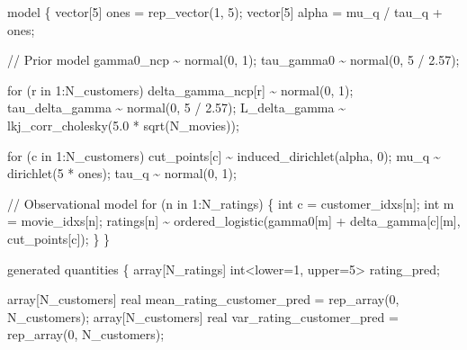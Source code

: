 \documentclass[
  letterpaper,
  DIV=11,
  numbers=noendperiod]{scrartcl}
\newenvironment{Shaded}{\begin{snugshade}}{\end{snugshade}}
\newcommand{\CommentTok}[1]{\textcolor[rgb]{0.37,0.37,0.37}{#1}}
\newcommand{\ControlFlowTok}[1]{\textcolor[rgb]{0.00,0.23,0.31}{#1}}
\newcommand{\DataTypeTok}[1]{\textcolor[rgb]{0.68,0.00,0.00}{#1}}
\newcommand{\DecValTok}[1]{\textcolor[rgb]{0.68,0.00,0.00}{#1}}
\newcommand{\FloatTok}[1]{\textcolor[rgb]{0.68,0.00,0.00}{#1}}
\newcommand{\KeywordTok}[1]{\textcolor[rgb]{0.00,0.23,0.31}{#1}}
\newcommand{\NormalTok}[1]{\textcolor[rgb]{0.00,0.23,0.31}{#1}}
\begin{document}
\begin{codelisting}
\begin{Shaded}
\begin{Highlighting}[]
\KeywordTok{model}\NormalTok{ \{}
  \DataTypeTok{vector}\NormalTok{[}\DecValTok{5}\NormalTok{] ones = rep\_vector(}\DecValTok{1}\NormalTok{, }\DecValTok{5}\NormalTok{);}
  \DataTypeTok{vector}\NormalTok{[}\DecValTok{5}\NormalTok{] alpha = mu\_q / tau\_q + ones;}

  \CommentTok{// Prior model}
\NormalTok{  gamma0\_ncp \textasciitilde{} normal(}\DecValTok{0}\NormalTok{, }\DecValTok{1}\NormalTok{);}
\NormalTok{  tau\_gamma0 \textasciitilde{} normal(}\DecValTok{0}\NormalTok{, }\DecValTok{5}\NormalTok{ / }\FloatTok{2.57}\NormalTok{);}

  \ControlFlowTok{for}\NormalTok{ (r }\ControlFlowTok{in} \DecValTok{1}\NormalTok{:N\_customers)}
\NormalTok{    delta\_gamma\_ncp[r] \textasciitilde{} normal(}\DecValTok{0}\NormalTok{, }\DecValTok{1}\NormalTok{);}
\NormalTok{  tau\_delta\_gamma \textasciitilde{} normal(}\DecValTok{0}\NormalTok{, }\DecValTok{5}\NormalTok{ / }\FloatTok{2.57}\NormalTok{);}
\NormalTok{  L\_delta\_gamma \textasciitilde{} lkj\_corr\_cholesky(}\FloatTok{5.0}\NormalTok{ * sqrt(N\_movies));}

  \ControlFlowTok{for}\NormalTok{ (c }\ControlFlowTok{in} \DecValTok{1}\NormalTok{:N\_customers)}
\NormalTok{    cut\_points[c] \textasciitilde{} induced\_dirichlet(alpha, }\DecValTok{0}\NormalTok{);}
\NormalTok{  mu\_q \textasciitilde{} dirichlet(}\DecValTok{5}\NormalTok{ * ones);}
\NormalTok{  tau\_q \textasciitilde{} normal(}\DecValTok{0}\NormalTok{, }\DecValTok{1}\NormalTok{);}

  \CommentTok{// Observational model}
  \ControlFlowTok{for}\NormalTok{ (n }\ControlFlowTok{in} \DecValTok{1}\NormalTok{:N\_ratings) \{}
    \DataTypeTok{int}\NormalTok{ c = customer\_idxs[n];}
    \DataTypeTok{int}\NormalTok{ m = movie\_idxs[n];}
\NormalTok{    ratings[n] \textasciitilde{} ordered\_logistic(gamma0[m] + delta\_gamma[c][m],}
\NormalTok{                                  cut\_points[c]);}
\NormalTok{  \}}
\NormalTok{\}}

\KeywordTok{generated quantities}\NormalTok{ \{}
  \DataTypeTok{array}\NormalTok{[N\_ratings] }\DataTypeTok{int}\NormalTok{\textless{}}\KeywordTok{lower}\NormalTok{=}\DecValTok{1}\NormalTok{, }\KeywordTok{upper}\NormalTok{=}\DecValTok{5}\NormalTok{\textgreater{} rating\_pred;}

  \DataTypeTok{array}\NormalTok{[N\_customers] }\DataTypeTok{real}\NormalTok{ mean\_rating\_customer\_pred}
\NormalTok{    = rep\_array(}\DecValTok{0}\NormalTok{, N\_customers);}
  \DataTypeTok{array}\NormalTok{[N\_customers] }\DataTypeTok{real}\NormalTok{ var\_rating\_customer\_pred}
\NormalTok{    = rep\_array(}\DecValTok{0}\NormalTok{, N\_customers);}


\end{Highlighting}
\end{Shaded}
\end{codelisting}
\end{document}
